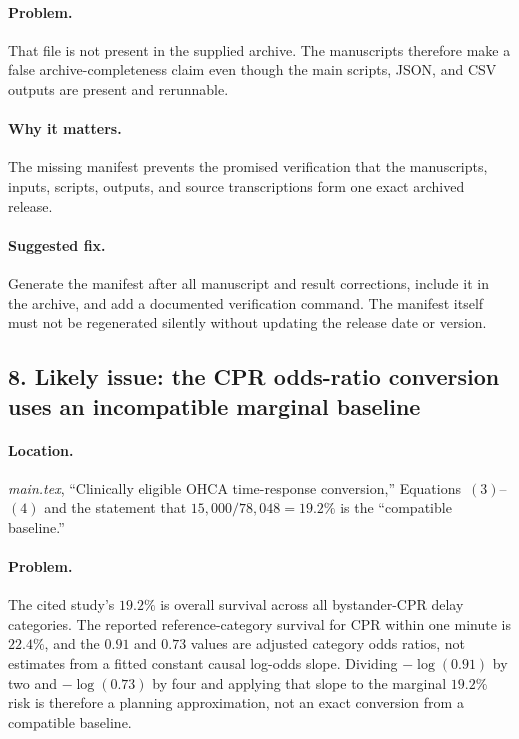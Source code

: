 \documentclass[11pt]{article}
\begin{document}
\paragraph{Problem.}
That file is not present in the supplied archive.  The manuscripts therefore
make a false archive-completeness claim even though the main scripts, JSON, and
CSV outputs are present and rerunnable.

\paragraph{Why it matters.}
The missing manifest prevents the promised verification that the manuscripts,
inputs, scripts, outputs, and source transcriptions form one exact archived
release.

\paragraph{Suggested fix.}
Generate the manifest after all manuscript and result corrections, include it
in the archive, and add a documented verification command.  The manifest
itself must not be regenerated silently without updating the release date or
version.

\subsection*{8. Likely issue: the CPR odds-ratio conversion uses an incompatible marginal baseline}

\paragraph{Location.}
\emph{main.tex}, ``Clinically eligible OHCA time-response conversion,''
Equations~\((3)\)--\((4)\) and the statement that \(15{,}000/78{,}048=19.2\%\)
is the ``compatible baseline.''

\paragraph{Problem.}
The cited study's \(19.2\%\) is overall survival across all bystander-CPR delay
categories.  The reported reference-category survival for CPR within one
minute is \(22.4\%\), and the \(0.91\) and \(0.73\) values are adjusted
category odds ratios, not estimates from a fitted constant causal log-odds
slope.  Dividing \(-\log(0.91)\) by two and \(-\log(0.73)\) by four and applying
that slope to the marginal \(19.2\%\) risk is therefore a planning
approximation, not an exact conversion from a compatible baseline.
\end{document}
